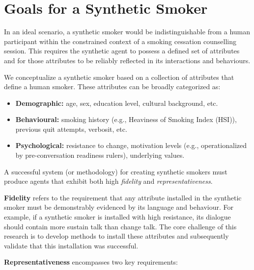 \section{Goals for a Synthetic Smoker}
\label{sec:synthetic-smoker-ideal}

In an ideal scenario, a synthetic smoker would be indistinguishable from a human participant within the constrained context of a smoking cessation counselling session. This requires the synthetic agent to possess a defined set of attributes and for those attributes to be reliably reflected in its interactions and behaviours.

We conceptualize a synthetic smoker based on a collection of attributes that define a human smoker. These attributes can be broadly categorized as:

\begin{itemize}
    \item \textbf{Demographic:} age, sex, education level, cultural background, etc.
    \item \textbf{Behavioural:} smoking history (e.g., Heaviness of Smoking Index (HSI)), previous quit attempts, verbosit, etc.
    \item \textbf{Psychological:} resistance to change, motivation levels (e.g., operationalized by pre-conversation readiness rulers), underlying values.
\end{itemize}

A successful system (or methodology) for creating synthetic smokers must produce agents that exhibit both high \emph{fidelity} and \emph{representativeness}.

\textbf{Fidelity} refers to the requirement that any attribute installed in the synthetic smoker must be demonstrably evidenced by its language and behaviour. For example, if a synthetic smoker is installed with high resistance, its dialogue should contain more sustain talk than change talk. The core challenge of this research is to develop methods to install these attributes and subsequently validate that this installation was successful.

\textbf{Representativeness} encompasses two key requirements:

